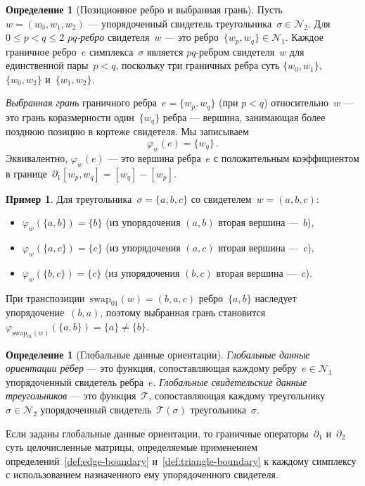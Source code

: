 \documentclass[11pt,a4paper]{article}
\theoremstyle{plain}
\theoremstyle{definition}
\newtheorem{definition}[theorem]{Определение}
\newtheorem{example}[theorem]{Пример}
\theoremstyle{remark}
\newcommand{\cN}{\mathcal{N}}
\newcommand{\cT}{\mathcal{T}}
\newcommand{\swapAB}{\mathrm{swap}_{01}}
\newcommand{\chosenface}{\varphi}
\begin{document}
\begin{definition}[Позиционное ребро и выбранная грань]
\label{def:chosen-face}
Пусть~$w = (w_0, w_1, w_2)$ --- упорядоченный свидетель
треугольника~$\sigma \in \cN_2$. Для $0 \leq p < q \leq 2$
\emph{$pq$-ребро} свидетеля~$w$ --- это ребро~$\{w_p, w_q\} \in \cN_1$.
Каждое граничное ребро~$e$ симплекса~$\sigma$ является $pq$-ребром
свидетеля~$w$ для единственной пары~$p < q$, поскольку три граничных
ребра суть $\{w_0,w_1\}$, $\{w_0,w_2\}$ и~$\{w_1,w_2\}$.

\emph{Выбранная грань} граничного ребра~$e = \{w_p, w_q\}$ (при $p < q$)
относительно~$w$ --- это грань коразмерности один~$\{w_q\}$ ребра ---
вершина, занимающая более позднюю позицию в кортеже свидетеля. Мы
записываем
\[
  \chosenface_w(e) = \{w_q\}\,.
\]
Эквивалентно, $\chosenface_w(e)$ --- это вершина ребра~$e$ с
положительным коэффициентом в границе~$\partial_1[w_p, w_q] = [w_q] - [w_p]$.
\end{definition}

\begin{example}
\label{ex:chosen}
Для треугольника~$\sigma = \{a,b,c\}$ со свидетелем~$w = (a,b,c)$:
\begin{itemize}[nosep]
  \item $\chosenface_w(\{a,b\}) = \{b\}$
        \quad (из упорядочения $(a,b)$ вторая вершина ---~$b$),
  \item $\chosenface_w(\{a,c\}) = \{c\}$
        \quad (из упорядочения $(a,c)$ вторая вершина ---~$c$),
  \item $\chosenface_w(\{b,c\}) = \{c\}$
        \quad (из упорядочения $(b,c)$ вторая вершина ---~$c$).
\end{itemize}
При транспозиции~$\swapAB(w) = (b,a,c)$ ребро~$\{a,b\}$
наследует упорядочение~$(b,a)$, поэтому выбранная грань становится
$\chosenface_{\swapAB(w)}(\{a,b\}) = \{a\} \neq \{b\}$.
\end{example}

\begin{definition}[Глобальные данные ориентации]
\label{def:global-orientation}
\emph{Глобальные данные ориентации рёбер} --- это функция, сопоставляющая
каждому ребру~$e \in \cN_1$ упорядоченный свидетель ребра~$e$.
\emph{Глобальные свидетельские данные треугольников} --- это
функция~$\cT$, сопоставляющая каждому треугольнику~$\sigma \in \cN_2$
упорядоченный свидетель~$\cT(\sigma)$ треугольника~$\sigma$.
\end{definition}

Если заданы глобальные данные ориентации, то граничные
операторы~$\partial_1$ и~$\partial_2$ суть целочисленные матрицы,
определяемые применением определений~\ref{def:edge-boundary}
и~\ref{def:triangle-boundary} к каждому симплексу с использованием
назначенного ему упорядоченного свидетеля.
\end{document}
